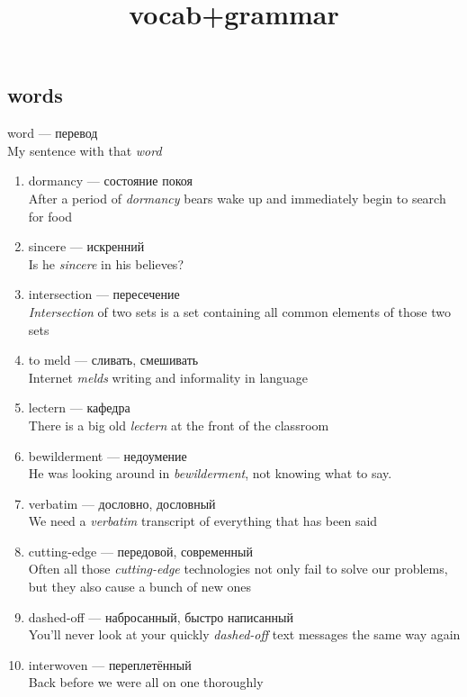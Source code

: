 \documentclass[
]{article}
\title{vocab+grammar}
\author{}
\date{}
\providecommand{\tightlist}{%
  \setlength{\itemsep}{0pt}\setlength{\parskip}{0pt}}
\begin{document}
\maketitle

\subsection{words}\label{words}

word --- перевод\\
My sentence with that \emph{word}

\begin{enumerate}
\tightlist
\item
  dormancy --- состояние покоя\\
  After a period of \emph{dormancy} bears wake up and immediately begin
  to search for food
\item
  sincere --- искренний\\
  Is he \emph{sincere} in his believes?
\item
  intersection --- пересечение\\
  \emph{Intersection} of two sets is a set containing all common
  elements of those two sets
\item
  to meld --- сливать, смешивать\\
  Internet \emph{melds} writing and informality in language
\item
  lectern --- кафедра\\
  There is a big old \emph{lectern} at the front of the classroom
\item
  bewilderment --- недоумение\\
  He was looking around in \emph{bewilderment}, not knowing what to say.
\item
  verbatim --- дословно, дословный\\
  We need a \emph{verbatim} transcript of everything that has been said
\item
  cutting-edge --- передовой, современный\\
  Often all those \emph{cutting-edge} technologies not only fail to
  solve our problems, but they also cause a bunch of new ones
\item
  dashed-off --- набросанный, быстро написанный\\
  You'll never look at your quickly \emph{dashed-off} text messages the
  same way again
\item
  interwoven --- переплетённый\\
  Back before we were all on one thoroughly\\

\end{enumerate}
\end{document}
